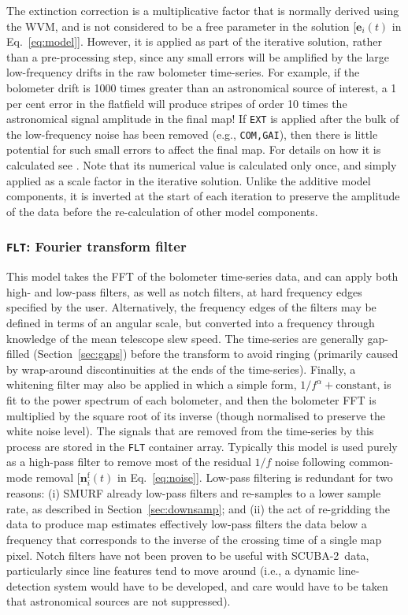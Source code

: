 \documentclass[useAMS,usenatbib,nofootinbib]{mn2e}
\newcommand{\scuba}{SCUBA-2}
\newcommand{\model}[1]{\texttt{#1}}
\begin{document}
The extinction correction is a multiplicative factor that is normally
derived using the WVM, and is not considered to be a free parameter in
the solution [$\mathbf{e}_i(t)$ in Eq.~\ref{eq:model}]. However, it is
applied as part of the iterative solution, rather than a
pre-processing step, since any small errors will be amplified by the
large low-frequency drifts in the raw bolometer time-series. For
example, if the bolometer drift is 1000 times greater than an
astronomical source of interest, a 1 per cent error in the flatfield
will produce stripes of order 10 times the astronomical signal
amplitude in the final map! If \model{EXT} is applied after the bulk
of the low-frequency noise has been removed (e.g., \model{COM,GAI}),
then there is little potential for such small errors to affect the
final map.  For details on how it is calculated see
\citet{dempsey2012}. Note that its numerical value is calculated only
once, and simply applied as a scale factor in the iterative
solution. Unlike the additive model components, it is inverted at the
start of each iteration to preserve the amplitude of the data before
the re-calculation of other model components.

\subsubsection{\model{FLT}: Fourier transform filter}
\label{sec:flt}

This model takes the FFT of the bolometer time-series data, and can
apply both high- and low-pass filters, as well as notch filters, at
hard frequency edges specified by the user. Alternatively, the
frequency edges of the filters may be defined in terms of an angular
scale, but converted into a frequency through knowledge of the mean
telescope slew speed. The time-series are generally gap-filled
(Section~\ref{sec:gaps}) before the transform to avoid ringing
(primarily caused by wrap-around discontinuities at the ends of the
time-series). Finally, a whitening filter may also be applied in which
a simple form, $1/f^\alpha + \mathrm{constant}$, is fit to the power
spectrum of each bolometer, and then the bolometer FFT is multiplied
by the square root of its inverse (though normalised to preserve the
white noise level).  The signals that are removed from the time-series
by this process are stored in the \model{FLT} container
array. Typically this model is used purely as a high-pass filter to
remove most of the residual $1/f$ noise following common-mode removal
[$\mathbf{n}^\mathrm{f}_i(t)$ in Eq.~\ref{eq:noise}]. Low-pass
filtering is redundant for two reasons: (i) SMURF already low-pass
filters and re-samples to a lower sample rate, as described in
Section~\ref{sec:downsamp}; and (ii) the act of re-gridding the data
to produce map estimates effectively low-pass filters the data below a
frequency that corresponds to the inverse of the crossing time of a
single map pixel. Notch filters have not been proven to be useful with
\scuba\ data, particularly since line features tend to move around
(i.e., a dynamic line-detection system would have to be developed, and
care would have to be taken that astronomical sources are not
suppressed).
\end{document}
